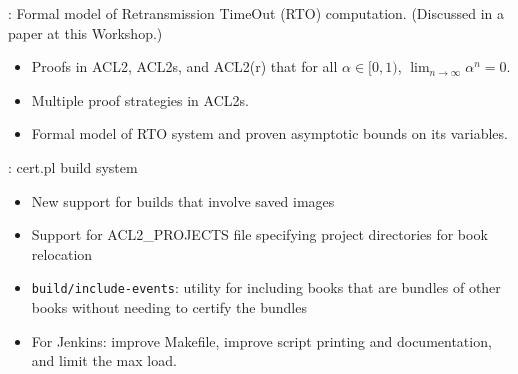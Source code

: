 
\begin{frame}

\newlibtitle

:
Formal model of Retransmission TimeOut (RTO) computation.
(Discussed in a paper at this Workshop.)
\begin{itemize}
\item Proofs in ACL2, ACL2s, and ACL2(r) that for all $\alpha \in [0, 1)$,
      $\lim_{n\to\infty}\alpha^n = 0$.
\item Multiple proof strategies in ACL2s.
\item Formal model of RTO system and proven asymptotic bounds on its variables.
\end{itemize}

\end{frame}


\begin{frame}

\implibtitle

:
cert.pl build system
\begin{itemize}
\item New support for builds that involve saved images
\item Support for ACL2\_PROJECTS file specifying project directories for book relocation
\item \texttt{build/include-events}: utility for including books that
  are bundles of other books without needing to certify the bundles
\item For Jenkins: improve Makefile, improve script printing and documentation, and limit the max load.
\end{itemize}

\end{frame}


